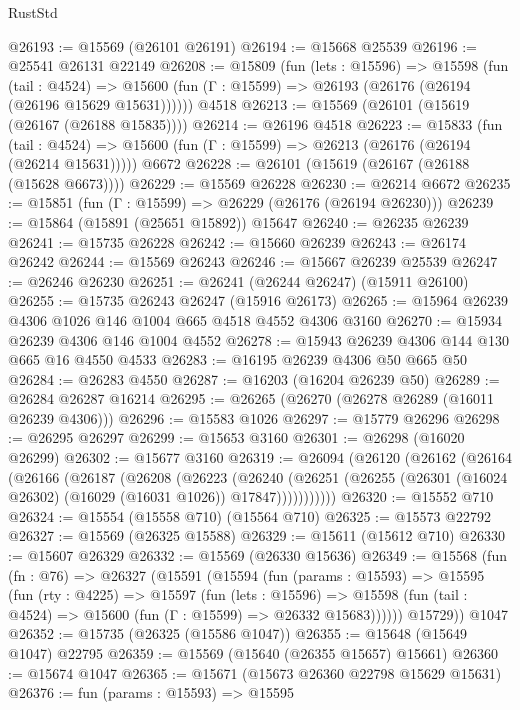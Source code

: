 \begin{lexlean}{RustStd}
\begin{coremodule}
@26193 := @15569 (@26101 @26191)
@26194 := @15668 @25539
@26196 := @25541 @26131 @22149
@26208 := @15809
    (fun (lets : @15596) =>
    @15598
      (fun (tail : @4524) =>
      @15600 (fun (Γ : @15599) => @26193 (@26176 (@26194 (@26196 @15629 @15631))))))
    @4518
@26213 := @15569 (@26101 (@15619 (@26167 (@26188 @15835))))
@26214 := @26196 @4518
@26223 := @15833
    (fun (tail : @4524) => @15600 (fun (Γ : @15599) => @26213 (@26176 (@26194 (@26214 @15631)))))
    @6672
@26228 := @26101 (@15619 (@26167 (@26188 (@15628 @6673))))
@26229 := @15569 @26228
@26230 := @26214 @6672
@26235 := @15851 (fun (Γ : @15599) => @26229 (@26176 (@26194 @26230)))
@26239 := @15864 (@15891 (@25651 @15892)) @15647
@26240 := @26235 @26239
@26241 := @15735 @26228
@26242 := @15660 @26239
@26243 := @26174 @26242
@26244 := @15569 @26243
@26246 := @15667 @26239 @25539
@26247 := @26246 @26230
@26251 := @26241 (@26244 @26247) (@15911 @26100)
@26255 := @15735 @26243 @26247 (@15916 @26173)
@26265 := @15964 @26239 @4306 @1026 @146 @1004 @665 @4518 @4552 @4306 @3160
@26270 := @15934 @26239 @4306 @146 @1004 @4552
@26278 := @15943 @26239 @4306 @144 @130 @665 @16 @4550 @4533
@26283 := @16195 @26239 @4306 @50 @665 @50
@26284 := @26283 @4550
@26287 := @16203 (@16204 @26239 @50)
@26289 := @26284 @26287 @16214
@26295 := @26265 (@26270 (@26278 @26289 (@16011 @26239 @4306)))
@26296 := @15583 @1026
@26297 := @15779 @26296
@26298 := @26295 @26297
@26299 := @15653 @3160
@26301 := @26298 (@16020 @26299)
@26302 := @15677 @3160
@26319 := @26094
    (@26120
      (@26162
        (@26164
          (@26166
            (@26187
              (@26208
                (@26223
                  (@26240
                    (@26251
                      (@26255 (@26301 (@16024 @26302) (@16029 (@16031 @1026)) @17847)))))))))))
@26320 := @15552 @710
@26324 := @15554 (@15558 @710) (@15564 @710)
@26325 := @15573 @22792
@26327 := @15569 (@26325 @15588)
@26329 := @15611 (@15612 @710)
@26330 := @15607 @26329
@26332 := @15569 (@26330 @15636)
@26349 := @15568
    (fun (fn : @76) =>
    @26327
      (@15591
        (@15594
          (fun (params : @15593) =>
          @15595
            (fun (rty : @4225) =>
            @15597
              (fun (lets : @15596) =>
              @15598 (fun (tail : @4524) => @15600 (fun (Γ : @15599) => @26332 @15683))))))
        @15729))
    @1047
@26352 := @15735 (@26325 (@15586 @1047))
@26355 := @15648 (@15649 @1047) @22795
@26359 := @15569 (@15640 (@26355 @15657) @15661)
@26360 := @15674 @1047
@26365 := @15671 (@15673 @26360 @22798 @15629 @15631)
@26376 := fun (params : @15593) =>
  @15595

\end{coremodule}
\end{lexlean}
